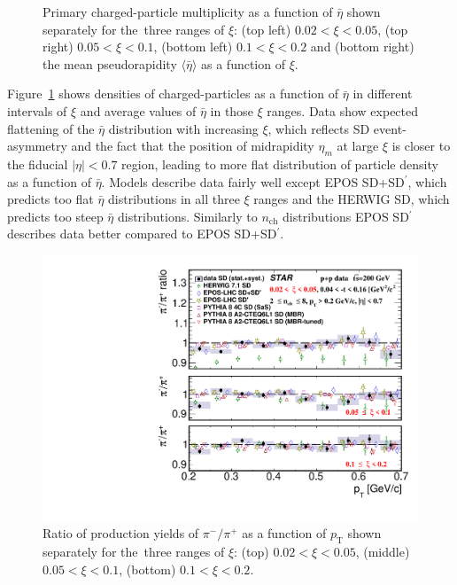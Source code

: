 \begin{figure}[t!]
	\caption{Primary charged-particle multiplicity as a function of $\bar{\eta}$ shown  separately for the~three ranges of  $\xi$: (top left) $0.02<\xi<0.05$, (top right) $0.05<\xi<0.1$, (bottom left) $0.1<\xi<0.2$ and (bottom right) the mean pseudorapidity  $\langle\bar{\eta}\rangle$ as a function of $\xi$.}
	\label{fig:results_star_eta}
\end{figure}

Figure~\ref{fig:results_star_eta} shows densities of  charged-particles as a function of $\bar{\eta}$ in different intervals of $\xi$ and average values of $\bar{\eta}$ in those $\xi$ ranges.
Data show expected flattening of the $\bar{\eta}$ distribution with increasing $\xi$, which reflects SD event-asymmetry and the fact that the position of midrapidity $\eta_m$ at large $\xi$ is closer to the fiducial $|\eta|<0.7$ region, leading to more flat distribution of particle density as a function of $\bar{\eta}$. Models describe data fairly well except EPOS SD+SD$^\prime$, which predicts too flat $\bar{\eta}$ distributions in all three $\xi$ ranges and the HERWIG SD, which predicts too steep $\bar{\eta}$ distributions. Similarly to $n_\textrm{ch}$ distributions  EPOS SD$^\prime$ describes data better compared to EPOS  SD+SD$^\prime$.



\begin{figure}[b!]
	\centering
	\includegraphics[width=.99\textwidth,page=1]{chapters/chrgSTAR/img/results/particleRatio_prt_0.pdf}
	\caption{Ratio of production yields of $\pi^-/\pi^+$ as a function of $p_\textrm{T}$ shown separately for the~three ranges of $\xi$: (top) $0.02<\xi<0.05$, (middle) $0.05<\xi<0.1$, (bottom) $0.1<\xi<0.2$.}
	\label{fig:results_star_pion}
	
\end{figure}

